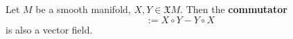 \begin{proposition}
  Let $M$ be a smooth manifold, $X, Y \in \mathfrak{X} M$.
  Then the \textbf{commutator}
  \begin{equation}
    [X, Y] := X \circ Y - Y \circ X
  \end{equation}
  is also a vector field.
\end{proposition}
